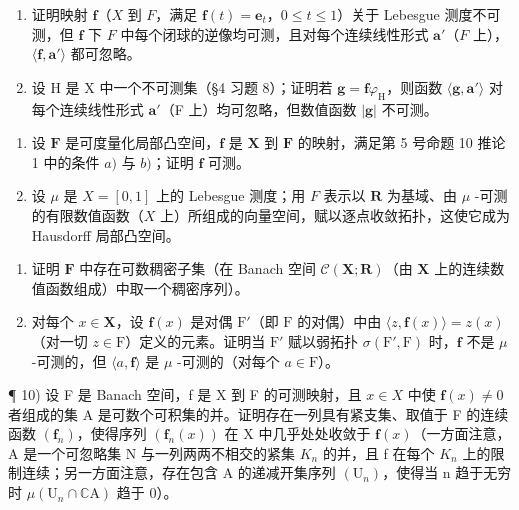 \begin{enumerate}
\def\labelenumi{\alph{enumi})}
\item
  证明映射 \(\mathbf{f}\)（\(X\) 到 \(F\)，满足 \(\mathbf{f}(t) = \mathbf{e}_t\)，\(0 \leqslant t \leqslant 1\)）关于 Lebesgue 测度不可测，但 \(\mathbf{f}\) 下 \(F\) 中每个闭球的逆像均可测，且对每个连续线性形式 \(\mathbf{a}'\)（\(F\) 上），\(\langle \mathbf{f}, \mathbf{a}' \rangle\) 都可忽略。
\item
  设 H 是 X 中一个不可测集（§4 习题 8）；证明若 \(\mathbf{g} = \mathbf{f}\varphi_{\mathrm{H}}\)，则函数 \(\langle \mathbf{g},\mathbf{a}'\rangle\) 对每个连续线性形式 \(\mathbf{a}'\)（F 上）均可忽略，但数值函数 \(|\mathbf{g}|\) 不可测。
\end{enumerate}

\begin{enumerate}
\def\labelenumi{\arabic{enumi})}
\setcounter{enumi}{7}
\item
  设 \(\mathbf{F}\) 是可度量化局部凸空间，\(\mathbf{f}\) 是 \(\mathbf{X}\) 到 \(\mathbf{F}\) 的映射，满足第 5 号命题 10 推论 1 中的条件 \(a)\) 与 \(b)\)；证明 \(\mathbf{f}\) 可测。
\item
  设 \(\mu\) 是 \(X = [0,1]\) 上的 Lebesgue 测度；用 \(F\) 表示以 \(\mathbf{R}\) 为基域、由 \(\mu\) -可测的有限数值函数（\(X\) 上）所组成的向量空间，赋以逐点收敛拓扑，这使它成为 Hausdorff 局部凸空间。
\end{enumerate}

\begin{enumerate}
\def\labelenumi{\alph{enumi})}
\item
  证明 \(\mathbf{F}\) 中存在可数稠密子集（在 Banach 空间 \(\mathcal{C}(\mathbf{X};\mathbf{R})\)（由 \(\mathbf{X}\) 上的连续数值函数组成）中取一个稠密序列）。
\item
  对每个 \(x \in \mathbf{X}\)，设 \(\mathbf{f}(x)\) 是对偶 \(\mathrm{F}'\)（即 \(\mathrm{F}\) 的对偶）中由 \(\langle z, \mathbf{f}(x) \rangle = z(x)\)（对一切 \(z \in \mathrm{F}\)）定义的元素。证明当 \(\mathrm{F}'\) 赋以弱拓扑 \(\sigma(\mathrm{F}', \mathrm{F})\) 时，\(\mathbf{f}\) 不是 \(\mu\) -可测的，但 \(\langle a, \mathbf{f} \rangle\) 是 \(\mu\) -可测的（对每个 \(a \in \mathrm{F}\)）。
\end{enumerate}

¶ 10) 设 F 是 Banach 空间，f 是 X 到 F 的可测映射，且 \(x \in X\) 中使 \(\mathbf{f}(x) \neq 0\) 者组成的集 A 是可数个可积集的并。证明存在一列具有紧支集、取值于 F 的连续函数 \((\mathbf{f}_n)\)，使得序列 \((\mathbf{f}_n(x))\) 在 X 中几乎处处收敛于 \(\mathbf{f}(x)\)（一方面注意，A 是一个可忽略集 N 与一列两两不相交的紧集 \(K_n\) 的并，且 f 在每个 \(K_n\) 上的限制连续；另一方面注意，存在包含 A 的递减开集序列 \((\mathrm{U}_n)\)，使得当 n 趋于无穷时 \(\mu(\mathrm{U}_n \cap \mathbb{C}\mathrm{A})\) 趋于 0）。

